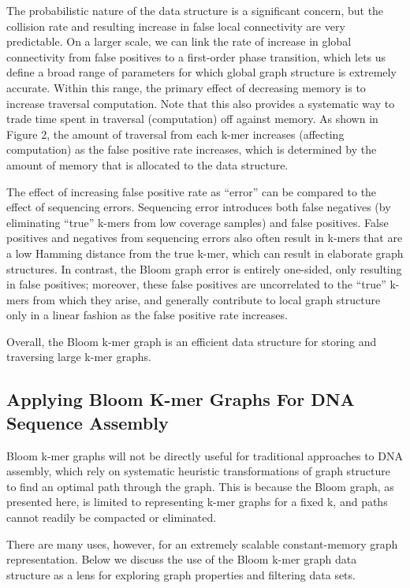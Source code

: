 \documentclass[12pt]{article} \usepackage{simplemargins}
\begin{document}
The probabilistic nature of the data structure is a significant
concern, but the collision rate and resulting increase in false local
connectivity are very predictable.  On a larger scale, we can link the
rate of increase in global connectivity from false positives to a
first-order phase transition, which lets us define a broad range of
parameters for which global graph structure is extremely accurate.
Within this range, the primary effect of decreasing memory is to increase
traversal computation.  Note that this also provides a systematic way
to trade time spent in traversal (computation) off against memory. As shown 
in Figure 2, the amount of traversal from each k-mer increases 
(affecting computation) as the false positive rate increases, which 
is determined by the amount of memory that is allocated to the data 
structure.

The effect of increasing false positive rate as ``error'' can be
compared to the effect of sequencing errors.  Sequencing error
introduces both false negatives (by eliminating ``true'' k-mers from
low coverage samples) and false positives.  False positives and
negatives from sequencing errors also often result in k-mers that are
a low Hamming distance from the true k-mer, which can result in
elaborate graph structures.  In contrast, the Bloom graph error is
entirely one-sided, only resulting in false positives; moreover, these
false positives are uncorrelated to the ``true'' k-mers from which
they arise, and generally contribute to local graph structure only 
in a linear fashion as the false positive rate increases.

Overall, the Bloom k-mer graph is an efficient data structure for
storing and traversing large k-mer graphs.

\subsection{Applying Bloom K-mer Graphs For DNA Sequence Assembly}
Bloom k-mer graphs will not be directly useful for traditional
approaches to DNA assembly, which rely on systematic heuristic
transformations of graph structure to find an optimal path through the
graph.  This is because the Bloom graph, as presented here, is limited
to representing k-mer graphs for a fixed k, and paths cannot readily
be compacted or eliminated.

There are many uses, however, for an extremely scalable
constant-memory graph representation.  Below we discuss the use of the
Bloom k-mer graph data structure as a lens for exploring graph
properties and filtering data sets.
\end{document}
